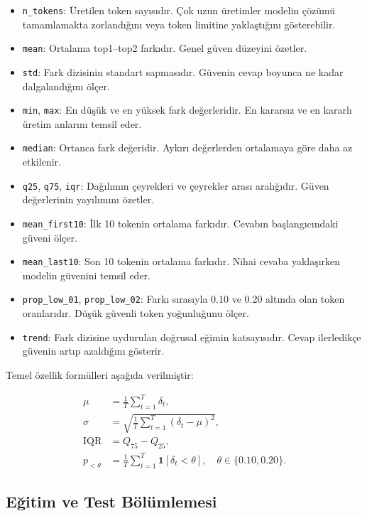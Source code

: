 \documentclass[conference]{IEEEtran}
\begin{document}
\begin{itemize}
  \item \texttt{n\_tokens}: Üretilen token sayısıdır. Çok uzun üretimler modelin
        çözümü tamamlamakta zorlandığını veya token limitine yaklaştığını
        gösterebilir.
  \item \texttt{mean}: Ortalama top1--top2 farkıdır. Genel güven düzeyini özetler.
  \item \texttt{std}: Fark dizisinin standart sapmasıdır. Güvenin cevap boyunca
        ne kadar dalgalandığını ölçer.
  \item \texttt{min}, \texttt{max}: En düşük ve en yüksek fark değerleridir.
        En kararsız ve en kararlı üretim anlarını temsil eder.
  \item \texttt{median}: Ortanca fark değeridir. Aykırı değerlerden ortalamaya
        göre daha az etkilenir.
  \item \texttt{q25}, \texttt{q75}, \texttt{iqr}: Dağılımın çeyrekleri ve
        çeyrekler arası aralığıdır. Güven değerlerinin yayılımını özetler.
  \item \texttt{mean\_first10}: İlk 10 tokenin ortalama farkıdır. Cevabın
        başlangıcındaki güveni ölçer.
  \item \texttt{mean\_last10}: Son 10 tokenin ortalama farkıdır. Nihai cevaba
        yaklaşırken modelin güvenini temsil eder.
  \item \texttt{prop\_low\_01}, \texttt{prop\_low\_02}: Farkı sırasıyla 0.10 ve
        0.20 altında olan token oranlarıdır. Düşük güvenli token yoğunluğunu
        ölçer.
  \item \texttt{trend}: Fark dizisine uydurulan doğrusal eğimin katsayısıdır.
        Cevap ilerledikçe güvenin artıp azaldığını gösterir.
\end{itemize}

Temel özellik formülleri aşağıda verilmiştir:

\begin{align}
  \mu &= \frac{1}{T}\sum_{t=1}^{T}\delta_t, \\
  \sigma &= \sqrt{\frac{1}{T}\sum_{t=1}^{T}(\delta_t-\mu)^2}, \\
  \mathrm{IQR} &= Q_{75}-Q_{25}, \\
  p_{<\theta} &= \frac{1}{T}\sum_{t=1}^{T}\mathbf{1}[\delta_t < \theta],
  \quad \theta \in \{0.10, 0.20\}.
\end{align}

\subsection{Eğitim ve Test Bölümlemesi}
\end{document}
